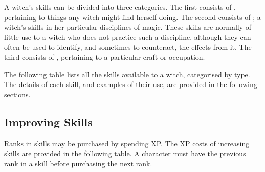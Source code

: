 A witch's skills can be divided into three categories.
The first consists of {\generalskills}, pertaining to things any witch might find herself doing.
The second consists of {\disciplineskills}; a witch's skills in her particular disciplines of magic.
These skills are normally of little use to a witch who does not practice such a discipline, although they can often be used to identify, and sometimes to counteract, the effects from it.
The third consists of {\specialityskills}, pertaining to a particular craft or occupation.

The following table lists all the skills available to a witch, categorised by type.
The details of each skill, and examples of their use, are provided in the following sections.


\subsection{Improving Skills}

Ranks in skills may be purchased by spending XP.
The XP costs of increasing skills are provided in the following table.
A character must have the previous rank in a skill before purchasing the next rank.

